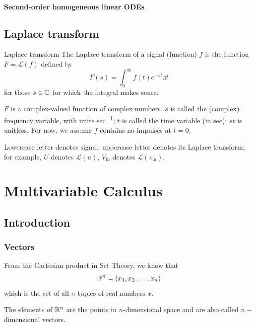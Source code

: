\subsubsection{Second-order homogeneous linear ODEs}

\pagebreak

\section{Laplace transform}
\begin{defn}{Laplace transform}{}
The Laplace transform of a signal (function) $f$ is the function $F = \mathcal{L}(f)$ defined by
\begin{equation}
F(s) = \int_0^\infty f(t)e^{-st} \dd{t}
\end{equation}
for those $s \in \mathbb C$ for which the integral makes sense.
\end{defn}

\begin{remark}
$F$ is a complex-valued function of complex numbers. $s$ is called the (complex) frequency variable, with units \unit{sec^{-1}}; $t$ is called the time variable (in \unit{sec}); $st$ is unitless. For now, we assume $f$ contains no impulses at $t=0$.
\end{remark}

\begin{notation}
Lowercase letter denotes signal; uppercase letter denotes its Laplace transform; for example, $U$ denotes $\mathcal{L}(u)$, $V_\text{in}$ denotes $\mathcal{L}(v_\text{in})$.
\end{notation}


\chapter{Multivariable Calculus}
\section{Introduction}
\subsection{Vectors}
From the Cartesian product in Set Theory, we know that
\[ \mathbb R^n = (x_1, x_2, \dots, x_n) \]
which is the set of all $n$-tuples of real numbers $x$.

The elements of $\mathbb R^n$ are the points in $n$-dimensional space and are also called $n-$dimensional vectors.

